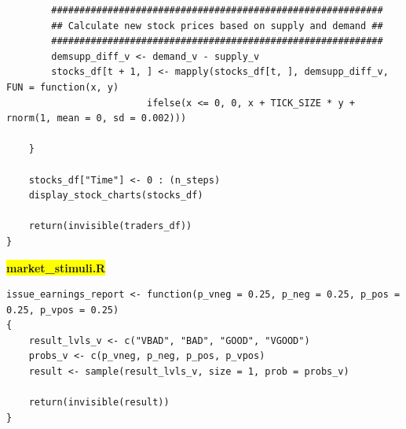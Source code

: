 \documentclass[12pt]{article}
\newcommand{\mybox}{%
    \collectbox{%
        \setlength{\fboxsep}{2pt}%
        \fbox{\BOXCONTENT}%
    }%
}
\begin{document}
\begin{lstlisting}
		###########################################################
		## Calculate new stock prices based on supply and demand ##
		###########################################################
		demsupp_diff_v <- demand_v - supply_v 
		stocks_df[t + 1, ] <- mapply(stocks_df[t, ], demsupp_diff_v, FUN = function(x, y) 
					     ifelse(x <= 0, 0, x + TICK_SIZE * y + rnorm(1, mean = 0, sd = 0.002))) 

	}

	stocks_df["Time"] <- 0 : (n_steps)
	display_stock_charts(stocks_df)
	
	return(invisible(traders_df))
}
\end{lstlisting}

\vspace{10mm}

\noindent\mybox{\colorbox{yellow}{\textbf{market\_stimuli.R}}}\hspace{3mm}\hrulefill
\begin{lstlisting}
issue_earnings_report <- function(p_vneg = 0.25, p_neg = 0.25, p_pos = 0.25, p_vpos = 0.25)
{
	result_lvls_v <- c("VBAD", "BAD", "GOOD", "VGOOD")
	probs_v <- c(p_vneg, p_neg, p_pos, p_vpos)	
	result <- sample(result_lvls_v, size = 1, prob = probs_v)
	
	return(invisible(result))
}
\end{lstlisting}
\end{document}
